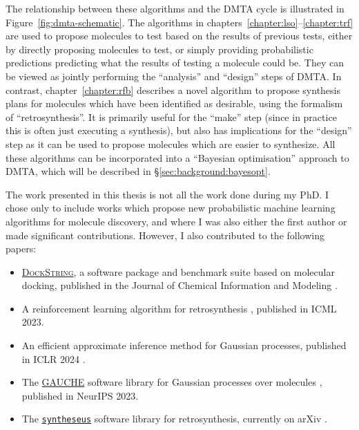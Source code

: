 The relationship between these algorithms and the DMTA cycle is illustrated in Figure~\ref{fig:dmta-schematic}.
The algorithms in chapters~\ref{chapter:lso}--\ref{chapter:trf} are used to propose molecules to test
based on the results of previous tests,
either by directly proposing molecules to test,
or simply providing probabilistic predictions predicting what the results of testing a molecule could be.
They can be viewed as jointly performing the ``analysis'' and ``design'' steps of DMTA.
In contrast, chapter~\ref{chapter:rfb} describes a novel algorithm to propose synthesis plans
for molecules which have been identified as desirable, using the formalism of ``retrosynthesis''.
It is primarily useful for the ``make'' step (since in practice this is often just executing a synthesis),
but also has implications for the ``design'' step as it can be used to propose molecules which are easier to synthesize.
All these algorithms can be incorporated into a ``Bayesian optimisation''
approach to DMTA, which will be described in \S\ref{sec:background:bayesopt}.

The work presented in this thesis is not all the work done during my PhD.
I chose only to include works which propose new probabilistic machine learning algorithms
for molecule discovery, and where I was also either the first author or made significant contributions.
However, I also contributed to the following papers:
\begin{itemize}
    \item \href{https://github.com/dockstring/dockstring}{\textsc{DockString}},
        a software package and benchmark suite based on molecular docking,
        published in the Journal of Chemical Information and Modeling  %
        \citep{ortegon2021dockstring}.
    \item A reinforcement learning algorithm for retrosynthesis \citep{liu2023pdvn},
        published in ICML 2023.
    \item An efficient approximate inference method for Gaussian processes,
        published in ICLR 2024 \citep{lin2024stochastic}.
    \item The \href{https://github.com/leojklarner/gauche}{GAUCHE} software library for Gaussian processes over molecules \citep{griffiths2024gauche},
        published in NeurIPS 2023.
    \item The \href{https://github.com/microsoft/syntheseus/}{\texttt{syntheseus}} software library for retrosynthesis,
        currently on arXiv \citep{maziarz2023re}.
\end{itemize}

